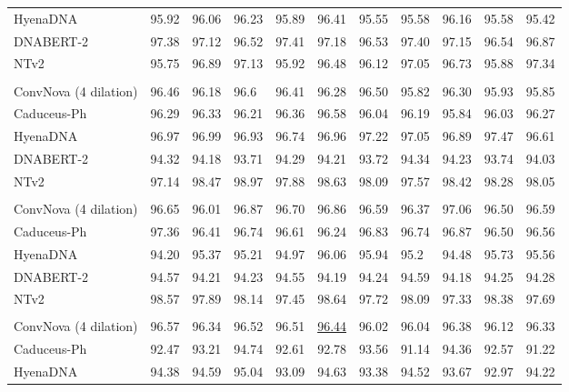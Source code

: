 \begin{table}[htbp]
{\begin{tabular}{lllllllllll}
    HyenaDNA  & 95.92 & 96.06 & 96.23 & 95.89 & 96.41 & 95.55 & 95.58 & 96.16 & 95.58 & 95.42 \\
    DNABERT-2 & 97.38  & 97.12  & 96.52  & 97.41  & 97.18  & 96.53  & 97.40  & 97.15  & 96.54  & 96.87 \\
    NTv2 & 95.75 & 96.89 & 97.13 & 95.92 & 96.48 & 96.12 & 97.05 & 96.73 & 95.88 & 97.34 \\
    \midrule
    \rowcolor{titlebg}\multicolumn{11}{l}{\textit{\textbf{Splice Sites All}}} \\
    \rowcolor{low}ConvNova (4 dilation) & 96.46 & 96.18 & 96.6  & 96.41 & 96.28 & 96.50  & 95.82 & 96.30  & 95.93 & 95.85 \\
    Caduceus-Ph & 96.29 & 96.33 & 96.21 & 96.36 & 96.58 & 96.04 & 96.19 & 95.84 & 96.03 & 96.27 \\
    HyenaDNA & 96.97 & 96.99 & 96.93 & 96.74 & 96.96 & 97.22 & 97.05 & 96.89 & 97.47 & 96.61 \\
    DNABERT-2  & 94.32  & 94.18  & 93.71  & 94.29  & 94.21  & 93.72  & 94.34  & 94.23  & 93.74  & 94.03 \\
    NTv2 & 97.14 & 98.47 & 98.97 & 97.88 & 98.63 & 98.09 & 97.57 & 98.42 & 98.28 & 98.05 \\
    \midrule
    \rowcolor{titlebg}\multicolumn{11}{l}{\textit{\textbf{Splice Sites Acceptor}}} \\
    \rowcolor{low}ConvNova (4 dilation) & 96.65 & 96.01 & 96.87 & 96.70  & 96.86 & 96.59 & 96.37 & 97.06 & 96.50  & 96.59 \\
    Caduceus-Ph & 97.36 & 96.41 & 96.74 & 96.61 & 96.24 & 96.83 & 96.74 & 96.87 & 96.50  & 96.56 \\
    HyenaDNA & 94.20  & 95.37 & 95.21 & 94.97 & 96.06 & 95.94 & 95.2  & 94.48 & 95.73 & 95.56 \\
    DNABERT-2 & 94.57  & 94.21  & 94.23  & 94.55  & 94.19  & 94.24  & 94.59  & 94.18  & 94.25  & 94.28 \\
    NTv2 & 98.57 & 97.89 & 98.14 & 97.45 & 98.64 & 97.72 & 98.09 & 97.33 & 98.38 & 97.69 \\
    \midrule
    \rowcolor{titlebg}\multicolumn{11}{l}{\textit{\textbf{Splice Sites Donor}}} \\
    \rowcolor{low}ConvNova (4 dilation) & 96.57 & 96.34 & 96.52 & 96.51 & \underline{96.44} & 96.02 & 96.04 & 96.38 & 96.12 & 96.33 \\
    Caduceus-Ph & 92.47 & 93.21 & 94.74 & 92.61 & 92.78 & 93.56 & 91.14 & 94.36 & 92.57 & 91.22 \\
    HyenaDNA & 94.38 & 94.59 & 95.04 & 93.09 & 94.63 & 93.38 & 94.52 & 93.67 & 92.97 & 94.22 \\

\end{tabular}}
\end{table}

